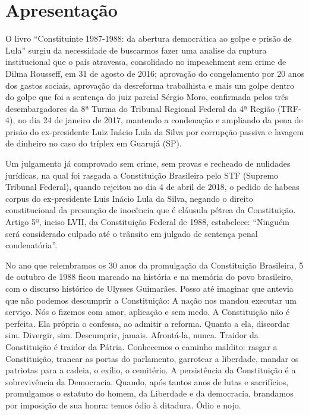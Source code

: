 \chapter{Apresentação}%

O livro “Constituinte 1987-1988: da abertura democrática ao golpe e prisão de Lula” surgiu da necessidade de buscarmos fazer uma analise da ruptura institucional que o país atravessa, consolidado no impeachment sem crime de Dilma Rousseff, em 31 de agosto de 2016; aprovação do congelamento por 20 anos dos gastos sociais, aprovação da desreforma trabalhista e mais um golpe dentro do golpe que foi a sentença do juiz parcial Sérgio Moro, confirmada pelos três desembargadores da 8ª Turma do Tribunal Regional Federal da 4ª Região (TRF-4), no dia 24 de janeiro de 2017, mantendo a condenação e ampliando da pena de prisão do ex-presidente Luiz Inácio Lula da Silva por corrupção passiva e lavagem de dinheiro no caso do tríplex em Guarujá (SP).

Um julgamento já comprovado sem crime, sem provas e recheado de nulidades jurídicas, na qual foi rasgada a Constituição Brasileira pelo STF (Supremo Tribunal Federal), quando rejeitou no dia 4 de abril de 2018, o pedido de habeas corpus do ex-presidente Luis Inácio Lula da Silva, negando o direito constitucional da presunção de inocência que é cláusula pétrea da Constituição. Artigo 5º, inciso LVII, da Constituição Federal de 1988, estabelece: “Ninguém será considerado culpado até o trânsito em julgado de sentença penal condenatória”.

No ano que relembramos os 30 anos da promulgação da Constituição Brasileira, 5 de outubro de 1988 ficou marcado na história e na memória do povo brasileiro, com o discurso histórico de Ulysses Guimarães. Posso até imaginar que antevia que não podemos descumprir a Constituição: A nação nos mandou executar um serviço. Nós o fizemos com amor, aplicação e sem medo. A Constituição não é perfeita. Ela própria o confessa, ao admitir a reforma. Quanto a ela, discordar sim. Divergir, sim. Descumprir, jamais. Afrontá-la, nunca. Traidor da Constituição é traidor da Pátria. Conhecemos o caminho maldito: rasgar a Constituição, trancar as portas do parlamento, garrotear a liberdade, mandar os patriotas para a cadeia, o exílio, o cemitério. A persistência da Constituição é a sobrevivência da Democracia. Quando, após tantos anos de lutas e sacrifícios, promulgamos o estatuto do homem, da Liberdade e da democracia, brandamos por imposição de sua honra: temos ódio à ditadura. Ódio e nojo.

